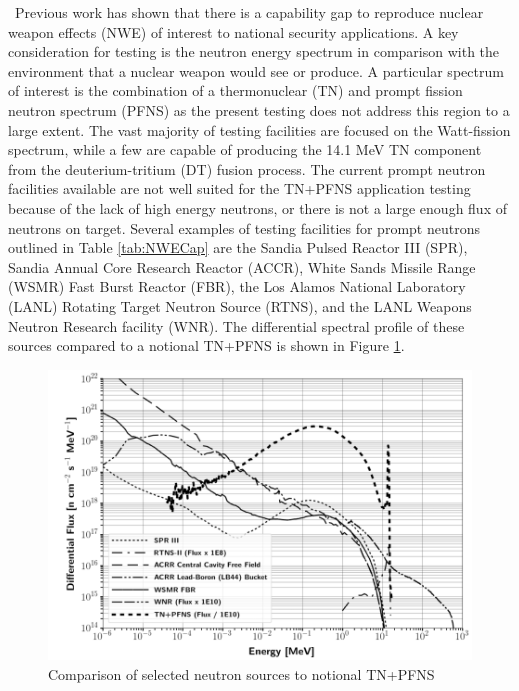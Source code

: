 \ Previous work has shown that there is a capability gap to reproduce nuclear weapon effects (NWE) of interest to national security applications\cite{JointDefenseScienceBoard/ThreatReductionAdvisoryComitteeTaskForce2010, Bevins}. 
A key consideration for testing is the neutron energy spectrum in comparison with the environment that a nuclear weapon would see or produce. 
A particular spectrum of interest is the combination of a thermonuclear (TN) and prompt fission neutron spectrum (PFNS) as the present testing does not address this region to a large extent. 
The vast majority of testing facilities are focused on the Watt-fission spectrum, while a few are capable of producing the 14.1 MeV TN component from the deuterium-tritium (DT) fusion process\cite{Bridgman}. 
The current prompt neutron facilities available are not well suited for the TN+PFNS application testing because of the lack of high energy neutrons, or there is not a large enough flux of neutrons on target. 
Several examples of testing facilities for prompt neutrons outlined in Table \ref{tab:NWECap} are the Sandia Pulsed Reactor III (SPR), Sandia Annual Core Research Reactor (ACCR), White Sands Missile Range (WSMR) Fast Burst Reactor (FBR), the Los Alamos National Laboratory (LANL) Rotating Target Neutron Source (RTNS), and the LANL Weapons Neutron Research facility (WNR). 
The differential spectral profile of these sources compared to a notional TN+PFNS is shown in Figure \ref{fig:CompSource}. 

\begin{figure}[ht]
	\centering
	\includegraphics[width=\linewidth]{Figures/Chapter1/SourceComparison.png}
	\caption[Comparison of selected neutron sources to notional TN+PFNS]{Comparison of selected neutron sources to notional TN+PFNS {\cite{Bevins}}}
    \label{fig:CompSource}
\end{figure}

